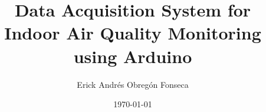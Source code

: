 \documentclass[10pt,a4paper]{article}
\begin{document}
\title{Data Acquisition System for Indoor Air Quality Monitoring using Arduino}
\author{Erick Andrés Obregón Fonseca}
\date{\today}
\maketitle




\begin{abstract}
\normalsize


\end{abstract}

\setcounter{tocdepth}{2}
\tableofcontents


\clearpage






\clearpage



\clearpage
{}

\end{document}
